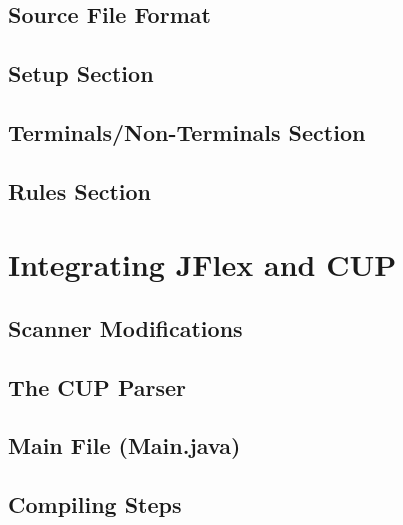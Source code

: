 \subsection{Source File Format}

\subsection{Setup Section}

\subsection{Terminals/Non-Terminals Section}

\subsection{Rules Section}

\section{Integrating JFlex and CUP}

\subsection{Scanner Modifications}

\subsection{The CUP Parser}

\subsection{Main File (Main.java)}

\subsection{Compiling Steps}